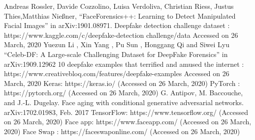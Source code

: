 
\begin{thebibliography}{99}
    Andreas Rossler, Davide Cozzolino, Luisa Verdoliva, Christian Riess, Justus
    Thies,Matthias Nießner, “FaceForensics++: Learning to Detect Manipulated Facial
    Images” in arXiv:1901.08971.
    Deepfake detection challenge dataset : https://www.kaggle.com/c/deepfake-detection challenge/data Accessed on 26 March, 2020
     Yuezun Li , Xin Yang , Pu Sun , Honggang Qi and Siwei Lyu “Celeb-DF: A
    Large-scale Challenging Dataset for DeepFake Forensics” in arXiv:1909.12962
    10 deepfake examples that terrified and amused the internet :
    https://www.creativebloq.com/features/deepfake-examples Accessed on 26 March,
    2020
    Keras: https://keras.io/ (Accessed on 26 March, 2020)
    PyTorch : https://pytorch.org/ (Accessed on 26 March, 2020)
    G. Antipov, M. Baccouche, and J.-L. Dugelay. Face aging with conditional generative adversarial networks. arXiv:1702.01983, Feb. 2017
     TensorFlow: https://www.tensorflow.org/ (Accessed on 26 March, 2020)
    Face app: https://www.faceapp.com/ (Accessed on 26 March, 2020)
    Face Swap : https://faceswaponline.com/ (Accessed on 26 March, 2020)

\end{thebibliography}
